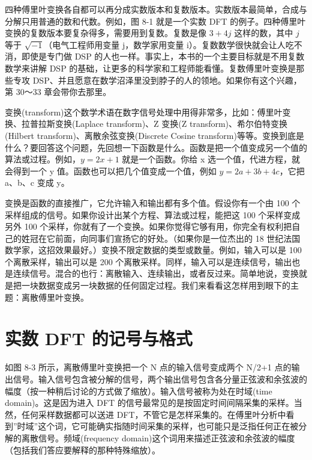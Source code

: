 四种傅里叶变换各自都可以再分成实数版本和复数版本。实数版本最简单，合成与分解只用普通的数和代数。例如，图
8-1 就是一个实数 DFT
的例子。四种傅里叶变换的复数版本要复杂得多，需要用到复数。复数是像
\(3 + 4j\) 这样的数，其中 \(j\) 等于 \(\sqrt{-1}\)（电气工程师用变量
j，数学家用变量 i）。复数数学很快就会让人吃不消，即使是专门做 DSP
的人也一样。事实上，本书的一个主要目标就是不用复数数学来讲解 DSP
的基础，让更多的科学家和工程师能看懂。复数傅里叶变换是那些专攻
DSP、并且愿意在数学沼泽里没到脖子的人的领地。如果你有这个兴趣，第 30～33
章会带你去那里。

变换(transform)这个数学术语在数字信号处理中用得非常多，比如：傅里叶变换、拉普拉斯变换(Laplace
transform)、Z 变换(Z transform)、希尔伯特变换(Hilbert
transform)、离散余弦变换(Discrete Cosine
transform)等等。变换到底是什么？要回答这个问题，先回想一下函数是什么。函数是把一个值变成另一个值的算法或过程。例如，\(y = 2x + 1\)
就是一个函数。你给 x 选一个值，代进方程，就会得到一个 y
值。函数也可以把几个值变成一个值，例如 \(y = 2a + 3b + 4c\)，它把
a、b、c 变成 y。

变换是函数的直接推广，它允许输入和输出都有多个值。假设你有一个由 100
个采样组成的信号。如果你设计出某个方程、算法或过程，能把这 100
个采样变成另外 100
个采样，你就有了一个变换。如果你觉得它够有用，你完全有权利把自己的姓冠在它前面，向同事们宣扬它的好处。（如果你是一位杰出的
18
世纪法国数学家，这招效果最好。）变换不限定数据的类型或数量。例如，输入可以是
100 个离散采样，输出可以是 200
个离散采样。同样，输入可以是连续信号，输出也是连续信号。混合的也行：离散输入、连续输出，或者反过来。简单地说，变换就是把一块数据变成另一块数据的任何固定过程。我们来看看这怎样用到眼下的主题：离散傅里叶变换。

\section{实数 DFT 的记号与格式}

如图 8-3 所示，离散傅里叶变换把一个 N 点的输入信号变成两个 N/2+1
点的输出信号。输入信号包含被分解的信号，两个输出信号包含各分量正弦波和余弦波的幅度（按一种稍后讨论的方式做了缩放）。输入信号被称为处在时域(time
domain)。这是因为进入 DFT
的信号最常见的是按固定时间间隔采集的采样。当然，任何采样数据都可以送进
DFT，不管它是怎样采集的。在傅里叶分析中看到''时域''这个词，它可能确实指随时间采集的采样，也可能只是泛指任何正在被分解的离散信号。频域(frequency
domain)这个词用来描述正弦波和余弦波的幅度（包括我们答应要解释的那种特殊缩放）。

